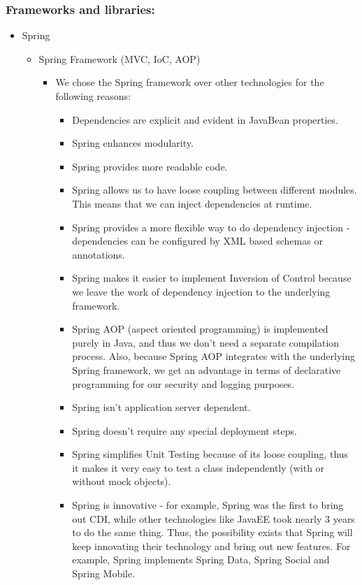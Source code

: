 \subsubsection{Frameworks and libraries:}
\begin{itemize}
	\item Spring
		\begin{itemize}
			\item Spring Framework (MVC, IoC, AOP)
				\begin{itemize}
					\item We chose the Spring framework over other technologies for the following reasons:
					\begin{itemize}
						\item Dependencies are explicit and evident in JavaBean properties.
						\item Spring enhances modularity.
						\item Spring provides more readable code.
						\item Spring allows us to have loose coupling between different modules. This means that we can inject dependencies at runtime.
						\item Spring provides a more flexible way to do dependency injection - dependencies can be configured by XML based schemas or annotations.
						\item Spring makes it easier to implement Inversion of Control because we leave the work of dependency injection to the underlying framework.
						\item Spring AOP (aspect oriented programming) is implemented purely in Java, and thus we don't need a separate compilation process. Also, because Spring AOP integrates with the underlying Spring framework, we get an advantage in terms of declarative programming for our security and logging purposes.
						\item Spring isn't application server dependent.
						\item Spring doesn't require any special deployment steps.
						\item Spring simplifies Unit Testing because of its loose coupling, thus it makes it very easy to test a class independently (with or without mock objects).
						\item Spring is innovative - for example, Spring was the first to bring out CDI, while other technologies like JavaEE took nearly 3 years to do the same thing. Thus, the possibility exists that Spring will keep innovating their technology and bring out new features. For example, Spring implements Spring Data, Spring Social and Spring Mobile.

\end{itemize}
\end{itemize}
\end{itemize}
\end{itemize}
